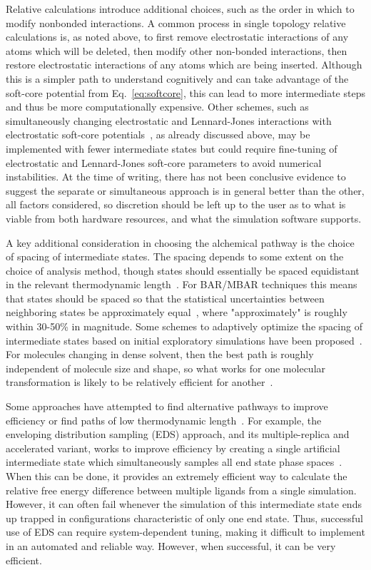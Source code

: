 \documentclass[9pt,bestpractices]{livecoms}
\begin{document}
Relative calculations introduce additional choices, such as the order in which to modify nonbonded interactions.
A common process in single topology relative calculations is, as noted above, to first remove electrostatic interactions of any atoms which will be deleted, then modify other non-bonded interactions, then restore electrostatic interactions of any atoms which are being inserted. Although this is a simpler path to understand cognitively and can take advantage of the soft-core potential from Eq.~\ref{eq:softcore}, this can lead to more intermediate steps and thus be more computationally expensive.
Other schemes, such as simultaneously changing electrostatic and Lennard-Jones interactions with electrostatic soft-core potentials~\cite{steinbrecher2007nonlinear}, as already discussed above, may be implemented with fewer intermediate states but could require fine-tuning of electrostatic and Lennard-Jones soft-core parameters to avoid numerical instabilities. 
At the time of writing, there has not been conclusive evidence to suggest the separate or simultaneous approach is in general better than the other, all factors considered, so discretion should be left up to the user as to what is viable from both hardware resources, and what the simulation software supports.

A key additional consideration in choosing the alchemical pathway is the choice of spacing of intermediate states.
The spacing depends to some extent on the choice of analysis method, though states should essentially be spaced equidistant in the relevant thermodynamic length~\cite{crooks2007measuring, sivak2012thermodynamic}.
For BAR/MBAR techniques this means that states should be spaced so that the statistical uncertainties between neighboring states be approximately equal~\cite{pham2012optimal, shenfeld2009minimizing}, where "approximately" is roughly within 30-50\% in magnitude. 
Some schemes to adaptively optimize the spacing of intermediate states based on initial exploratory simulations have been proposed~\cite{hayes2017adaptive}. For molecules changing in dense solvent, then the best path is roughly independent of molecule size and shape, so what works for one molecular transformation is likely to be relatively efficient for another~\cite{monroe2014converging}.


Some approaches have attempted to find alternative pathways to improve efficiency or find paths of low thermodynamic length~\cite{naden2014linear,naden2015linear,pham2012optimal}. For example, the enveloping distribution sampling (EDS) approach, and its multiple-replica and accelerated variant, works to improve efficiency by creating a single artificial intermediate state which simultaneously samples all end state phase spaces~\cite{perthold2018accelerated,sidler2017efficient, christ2007enveloping}. When this can be done, it provides an extremely efficient way to calculate the relative free energy difference between multiple ligands from a single simulation. However, it can often fail whenever the simulation of this intermediate state ends up trapped in configurations characteristic of only one end state. Thus, successful use of EDS can require system-dependent tuning, making it difficult to implement in an automated and reliable way. However, when successful, it can be very efficient.
\end{document}
